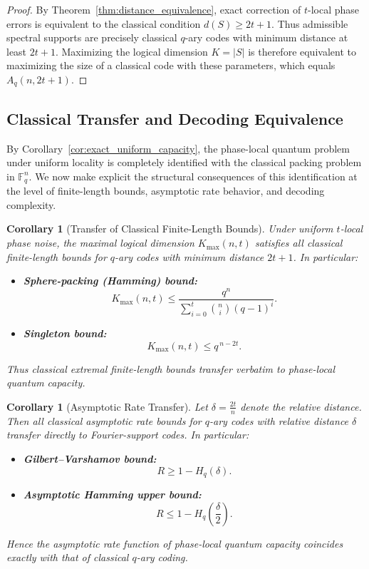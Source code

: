\documentclass[a4paper,twocolumn,11pt,allowtoday]{quantumarticle}
\theoremstyle{plain}
\newtheorem{corollary}[theorem]{Corollary}
\theoremstyle{definition}
\theoremstyle{remark}
\begin{document}
\begin{proof}
By Theorem~\ref{thm:distance_equivalence}, exact correction
of $t$-local phase errors is equivalent to the classical
condition $d(S)\ge 2t+1$.
Thus admissible spectral supports are precisely classical
$q$-ary codes with minimum distance at least $2t+1$.
Maximizing the logical dimension $K=|S|$
is therefore equivalent to maximizing the size
of a classical code with these parameters,
which equals $A_q(n,2t+1)$.
\end{proof}

\subsection{Classical Transfer and Decoding Equivalence}
\label{subsec:classical_transfer}

By Corollary~\ref{cor:exact_uniform_capacity}, the phase-local quantum problem under uniform locality is completely identified with the classical packing problem in $\mathbb{F}_q^n$. We now make explicit the structural consequences of this identification at the level of finite-length bounds, asymptotic rate behavior, and decoding complexity.

\begin{corollary}[Transfer of Classical Finite-Length Bounds]
\label{cor:upper_bounds_transfer}
Under uniform $t$-local phase noise, the maximal logical dimension
$K_{\max}(n,t)$ satisfies all classical finite-length bounds
for $q$-ary codes with minimum distance $2t+1$. In particular:

\begin{itemize}
\item \textbf{Sphere-packing (Hamming) bound:}
\[
K_{\max}(n,t)
\le
\frac{q^n}
{\displaystyle\sum_{i=0}^{t}\binom{n}{i}(q-1)^i}.
\]

\item \textbf{Singleton bound:}
\[
K_{\max}(n,t)
\le
q^{\,n-2t}.
\]
\end{itemize}

Thus classical extremal finite-length bounds transfer verbatim
to phase-local quantum capacity.
\end{corollary}



\begin{corollary}[Asymptotic Rate Transfer]
\label{cor:asymptotic_transfer}
Let $\delta=\frac{2t}{n}$ denote the relative distance.
Then all classical asymptotic rate bounds for $q$-ary codes
with relative distance $\delta$ transfer directly to
Fourier-support codes. In particular:

\begin{itemize}
\item \textbf{Gilbert--Varshamov bound:}
\[
R \ge 1-H_q(\delta).
\]

\item \textbf{Asymptotic Hamming upper bound:}
\[
R \le 1-H_q\!\left(\frac{\delta}{2}\right).
\]
\end{itemize}

Hence the asymptotic rate function of phase-local quantum
capacity coincides exactly with that of classical $q$-ary coding.
\end{corollary}
\end{document}
